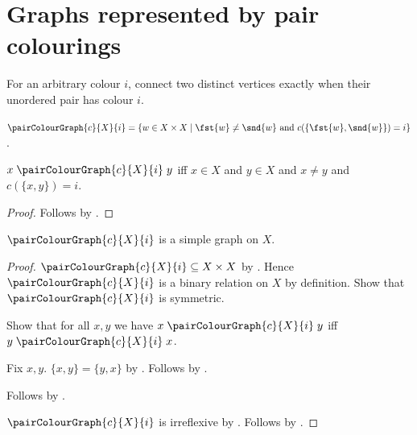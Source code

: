 \section{Graphs represented by pair colourings}







For an arbitrary colour $i$, connect two distinct vertices exactly when their
unordered pair has colour $i$.

\begin{definition}\label{pair_colour_graph}
    $\pairColourGraph{c}{X}{i}
        =\{w\in X\times X\mid
            \text{$\fst{w}\neq\snd{w}$ and
            $c(\{\fst{w},\snd{w}\})=i$}\}$.
\end{definition}

\begin{proposition}\label{pair_colour_graph_iff}
    $x\mathrel{\pairColourGraph{c}{X}{i}}y$ iff
        $x\in X$ and $y\in X$ and $x\neq y$ and $c(\{x,y\})=i$.
\end{proposition}
\begin{proof}
    Follows by
        .
\end{proof}

\begin{proposition}\label{pair_colour_graph_simple}
    $\pairColourGraph{c}{X}{i}$ is a simple graph on $X$.
\end{proposition}
\begin{proof}
    $\pairColourGraph{c}{X}{i}\subseteq X\times X$ by
        .
    Hence $\pairColourGraph{c}{X}{i}$ is a binary relation on $X$ by
        definition.
    Show that $\pairColourGraph{c}{X}{i}$ is symmetric.
    \begin{subproof}
        Show that for all $x,y$ we have
            $x\mathrel{\pairColourGraph{c}{X}{i}}y$ iff
            $y\mathrel{\pairColourGraph{c}{X}{i}}x$.
        \begin{subproof}
            Fix $x,y$.
            $\{x,y\}=\{y,x\}$ by .
            Follows by .
        \end{subproof}
        Follows by .
    \end{subproof}
    $\pairColourGraph{c}{X}{i}$ is irreflexive by
        .
    Follows by .
\end{proof}

